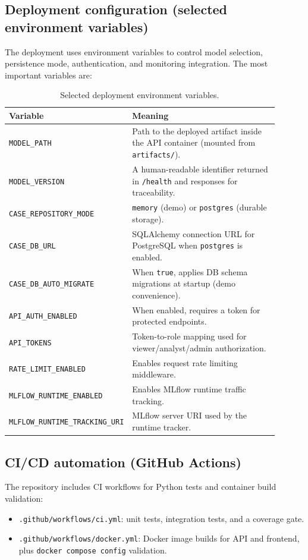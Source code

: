 \documentclass[11pt]{article}
\newcommand{\code}[1]{\texttt{#1}}
\begin{document}
\subsection{Deployment configuration (selected environment variables)}
The deployment uses environment variables to control model selection, persistence mode, authentication, and monitoring integration. The most important variables are:

\begin{table}[H]
\centering
\begin{tabular}{p{0.32\linewidth}p{0.58\linewidth}}
\toprule
Variable & Meaning \\
\midrule
\code{MODEL\_PATH} & Path to the deployed artifact inside the API container (mounted from \code{artifacts/}). \\
\code{MODEL\_VERSION} & A human-readable identifier returned in \code{/health} and responses for traceability. \\
\code{CASE\_REPOSITORY\_MODE} & \code{memory} (demo) or \code{postgres} (durable storage). \\
\code{CASE\_DB\_URL} & SQLAlchemy connection URL for PostgreSQL when \code{postgres} is enabled. \\
\code{CASE\_DB\_AUTO\_MIGRATE} & When \code{true}, applies DB schema migrations at startup (demo convenience). \\
\code{API\_AUTH\_ENABLED} & When enabled, requires a token for protected endpoints. \\
\code{API\_TOKENS} & Token-to-role mapping used for viewer/analyst/admin authorization. \\
\code{RATE\_LIMIT\_ENABLED} & Enables request rate limiting middleware. \\
\code{MLFLOW\_RUNTIME\_ENABLED} & Enables MLflow runtime traffic tracking. \\
\code{MLFLOW\_RUNTIME\_TRACKING\_URI} & MLflow server URI used by the runtime tracker. \\
\bottomrule
\end{tabular}
\caption{Selected deployment environment variables.}
\end{table}

\subsection{CI/CD automation (GitHub Actions)}
The repository includes CI workflows for Python tests and container build validation:
\begin{itemize}
  \item \code{.github/workflows/ci.yml}: unit tests, integration tests, and a coverage gate.
  \item \code{.github/workflows/docker.yml}: Docker image builds for API and frontend, plus \code{docker compose config} validation.
\end{itemize}
\end{document}
